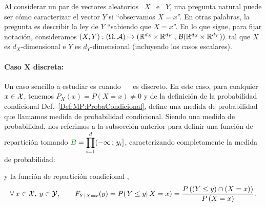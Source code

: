 \label{Sec:MP:LeyesCondicionales}

Al  considerar un  par de  vectores aleatorios  \ $X$  \ e  \ $Y$,  una pregunta
natural puede ser  c\'omo caracterizar el vector $Y$ si  ``observamos $X = x$''.
En otras palabras,  la pregunta es describir la ley  de $Y$ ``sabiendo   que  $X  =  x$''.   En  lo que  sigue,  para  fijar  notaci\'on,
consideramos $(X,Y): (  \Omega , \mathcal{A}) \mapsto (\mathbb{R}^{d_X}  \! \times \mathbb{R}^{d_Y}
\,   ,  \,  \mathcal{B}(\mathbb{R}^{d_X}   \!   \times   \mathbb{R}^{d_Y})  )$   tal  que   $X$  es
$d_X$-dimensional   e   $Y$   es   $d_Y$-dimensional   (incluyendo   los   casos
escalares).  



\paragraph{Caso $\boldsymbol{X}$ discreta:}
Un caso  sencillo a estudiar  es cuando \  \modif{$\X$} \ es discreto.   En este
caso, para  cualquier $x  \in \mathcal{X}$, tenemos  $P_X(x) = P(X  = x)  \ne 0$ y  de la
definici\'on de  la probabilidad condicional Def.~\ref{Def:MP:ProbaCondicional},
 define  una medida de
probabilidad que llamamos medida de probabilidad condicional.  Siendo una medida
de  probabilidad, nos  referimos a  la  subsecci\'on anterior  para definir  una
funci\'on  de  repartici\'on tomando  $\displaystyle  \modif{B} =  \prod_{i=1}^d
(-\infty \; y_i]$, caracterizando completamente la medida de probabilidad:
%
\begin{definicion}
\label{Def:MP:ReparticionCondicionalDiscreta}
%
  y la funci\'on de repartici\'on condicional ,
  \[
  \forall \:  x \in  \mathcal{X}, \: y  \in \mathcal{Y}, \qquad  F_{Y|X=x}(y) =  P( \left. Y  \le y
  \right| X = x ) = \frac{P\left(  \left(Y \le y \right) \cap \left(X = x\right)
    \right)}{P\left(X = x\right)}.
  \]
\end{definicion}

